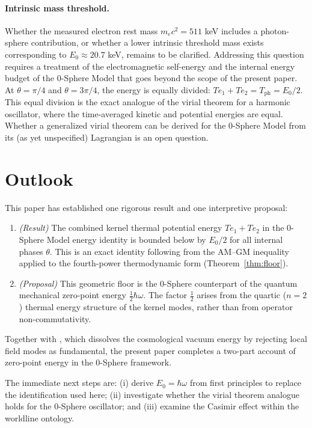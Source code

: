 \documentclass[%
 reprint, amsmath,amssymb, aps, prb, ]{revtex4-2}
\numberwithin{equation}{section}
\begin{document}
\paragraph{Intrinsic mass threshold.} Whether the measured electron rest mass $m_ec^2 = 511$ keV includes a photon-sphere contribution, or whether a lower intrinsic threshold mass exists corresponding to $E_0 \approx 20.7$ keV, remains to be clarified. Addressing this question requires a treatment of the electromagnetic self-energy and the internal energy budget of the 0-Sphere Model that goes beyond the scope of the present paper. At $\theta = \pi/4$ and $\theta = 3\pi/4$, the energy is equally divided: $Te_1 + Te_2 = T_\text{ph} = E_0/2$. This equal division is the exact analogue of the virial theorem for a harmonic oscillator, where the time-averaged kinetic and potential energies are equal. Whether a generalized virial theorem can be derived for the 0-Sphere Model from its (as yet unspecified) Lagrangian is an open question.

\section{Outlook}
\label{sec:outlook}

This paper has established one rigorous result and one interpretive proposal:
\begin{enumerate}
\item \textit{(Result)} The combined kernel thermal potential energy $Te_1 + Te_2$ in the 0-Sphere Model energy identity is bounded below by $E_0/2$ for all internal phases $\theta$. This is an exact identity following from the AM--GM inequality applied to the fourth-power thermodynamic form (Theorem~\ref{thm:floor}).
\item \textit{(Proposal)} This geometric floor is the 0-Sphere counterpart of the quantum mechanical zero-point energy $\tfrac{1}{2}\hbar\omega$. The factor $\tfrac{1}{2}$ arises from the quartic ($n=2$) thermal energy structure of the kernel modes, rather than from operator non-commutativity.
\end{enumerate}

Together with \cite{hanamura2026_32}, which dissolves the cosmological vacuum energy by rejecting local field modes as fundamental, the present paper completes a two-part account of zero-point energy in the 0-Sphere framework.

The immediate next steps are: (i) derive $E_0 = \hbar\omega$ from first principles to replace the identification used here; (ii) investigate whether the virial theorem analogue holds for the 0-Sphere oscillator; and (iii) examine the Casimir effect within the worldline ontology.
\end{document}
